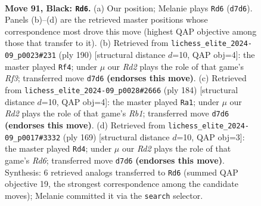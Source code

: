 \documentclass[11pt]{article}
\begin{document}
\clearpage

\begin{figure}[p]\centering
\begin{subfigure}{0.46\textwidth}\centering
\resizebox{\linewidth}{!}{%
\newchessgame
\chessboard[
  setfen={r7/2kr4/8/5R2/6KP/8/8/8 b - - 24 91},
  showmover=false,
  pgfstyle=straightmove, color=movearrow, markmove={d7-d6}
]}
\caption{}
\end{subfigure}\hfill
\begin{subfigure}{0.46\textwidth}\centering
\resizebox{\linewidth}{!}{%
\newchessgame
\chessboard[
  setfen={8/8/2r5/3k4/8/5RK1/8/8 w - - 21 96},
  showmover=false,
  pgfstyle=straightmove, color=movearrow, markmove={f3-f4}
]}
\caption{}
\end{subfigure}
\\[4pt]
\begin{subfigure}{0.46\textwidth}\centering
\resizebox{\linewidth}{!}{%
\newchessgame
\chessboard[
  setfen={8/8/8/5k2/4r3/8/1K6/1R6 w - - 36 93},
  showmover=false,
  pgfstyle=straightmove, color=movearrow, markmove={b1-a1}
]}
\caption{}
\end{subfigure}\hfill
\begin{subfigure}{0.46\textwidth}\centering
\resizebox{\linewidth}{!}{%
\newchessgame
\chessboard[
  setfen={6K1/5R2/8/8/8/2kr4/8/8 b - - 17 85},
  showmover=false,
  pgfstyle=straightmove, color=movearrow, markmove={d3-d4}
]}
\caption{}
\end{subfigure}
\caption{\textbf{Move 91, Black: \texttt{Rd6}.} (a) Our position; Melanie plays \texttt{Rd6} (\texttt{d7d6}). Panels (b)--(d) are the retrieved master positions whose correspondence most drove this move (highest QAP objective among those that transfer to it). (b) Retrieved from \texttt{lichess\_elite\_2024-09\_p0023\#231} (ply 190) [structural distance $d$=10, QAP obj=4]: the master played \texttt{Rf4}; under $\mu$ our \emph{Rd2} plays the role of that game's \emph{Rf3}; transferred move \texttt{d7d6} \textbf{(endorses this move)}. (c) Retrieved from \texttt{lichess\_elite\_2024-09\_p0028\#2666} (ply 184) [structural distance $d$=10, QAP obj=4]: the master played \texttt{Ra1}; under $\mu$ our \emph{Rd2} plays the role of that game's \emph{Rb1}; transferred move \texttt{d7d6} \textbf{(endorses this move)}. (d) Retrieved from \texttt{lichess\_elite\_2024-09\_p0017\#3332} (ply 169) [structural distance $d$=10, QAP obj=3]: the master played \texttt{Rd4}; under $\mu$ our \emph{Rd2} plays the role of that game's \emph{Rd6}; transferred move \texttt{d7d6} \textbf{(endorses this move)}. Synthesis: 6 retrieved analogs transferred to \texttt{Rd6} (summed QAP objective 19, the strongest correspondence among the candidate moves); Melanie committed it via the \texttt{search} selector.}
\label{fig:thought-m181}
\end{figure}
\end{document}
